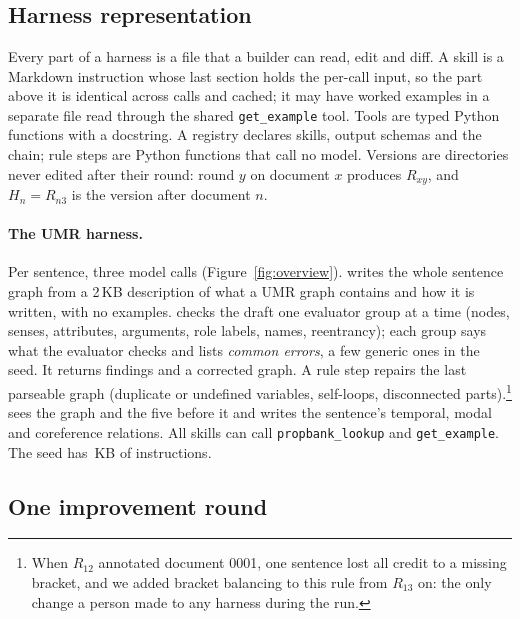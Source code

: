 \section{\sys}
\label{sec:method}

\subsection{Harness representation}
\label{sec:harness}

Every part of a harness is a file that a builder can read, edit and diff. A skill is a Markdown instruction whose last section holds the per-call input, so the part above it is identical across calls and cached; it may have worked examples in a separate file read through the shared \texttt{get\_example} tool. Tools are typed Python functions with a docstring. A registry declares skills, output schemas and the chain; rule steps are Python functions that call no model. Versions are directories never edited after their round: round $y$ on document $x$ produces $R_{xy}$, and $H_n = R_{n3}$ is the version after document $n$.

\paragraph{The UMR harness.}
Per sentence, three model calls (Figure~\ref{fig:overview}).  writes the whole sentence graph from a 2\,KB description of what a UMR graph contains and how it is written, with no examples.  checks the draft one evaluator group at a time (nodes, senses, attributes, arguments, role labels, names, reentrancy); each group says what the evaluator checks and lists \emph{common errors}, a few generic ones in the seed. It returns findings and a corrected graph. A rule step repairs the last parseable graph (duplicate or undefined variables, self-loops, disconnected parts).\footnote{When $R_{12}$ annotated document 0001, one sentence lost all credit to a missing bracket, and we added bracket balancing to this rule from $R_{13}$ on: the only change a person made to any harness during the run.}  sees the graph and the five before it and writes the sentence's temporal, modal and coreference relations. All skills can call \texttt{propbank\_lookup} and \texttt{get\_example}. The seed has \sizeSeed{}\,KB of instructions.

\subsection{One improvement round}
\label{sec:round}

